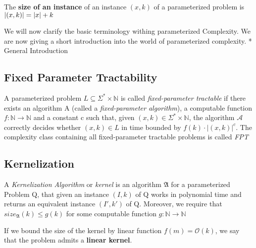 \begin{definition}
    The \textbf{size of an instance} of an instance $(x,k)$ of a parameterized problem is $\abs{(x,k)} = \abs{x} + k$
\end{definition}
We will now clarify the basic terminology withing parameterized Complexity. 
We are now giving a short introduction into the world of parameterized complexity. 
* General Introduction


\subsection{Fixed Parameter Tractability}

\begin{definition} 
    A parameterized problem $L\subseteq\Sigma^*\times\mathbb{N}$ is called \textit{fixed-parameter tractable} if there exists an algorithm A (called a \textit{fixed-parameter algorithm}), a computable function $f:\mathbb{N} \rightarrow \mathbb{N}$ and a constant c such that, given $(x,k) \in \Sigma^* \times \mathbb{N}$, the algorithm $\mathcal{A}$ correctly decides whether $(x,k) \in L$ in time bounded by $f(k) \cdot |(x,k)|^c$. The complexity class containing all fixed-parameter tractable problems is called \textit{FPT}
\end{definition}


\subsection{Kernelization}

\begin{definition}
A \textit{Kernelization Algorithm} or \textit{kernel} is an algorithm $\mathfrak{A}$ for a parameterized Problem Q, that given an instance $(I,k)$ of Q works in polynomial time and returns an equivalent instance $(I', k')$ of Q. Moreover, we require that $size_{\mathfrak{A}}(k) \leq g(k)$ for some computable function $g:\mathbb{N} \rightarrow \mathbb{N}$
\end{definition}

If we bound the size of the kernel by linear function $f(m) = \mathcal{O}(k)$, we say that the problem admits a \textbf{linear kernel}. 


